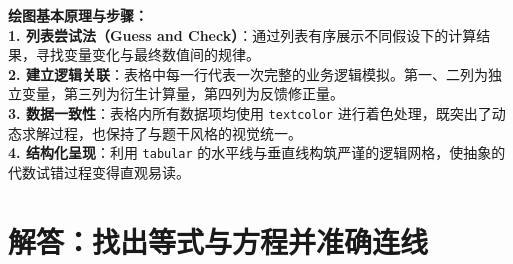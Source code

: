 \vspace{0.6cm}

{\small\color{blue!70!black}
\textbf{绘图基本原理与步骤：}\\
\textbf{1. 列表尝试法（Guess and Check）}：通过列表有序展示不同假设下的计算结果，寻找变量变化与最终数值间的规律。\\
\textbf{2. 建立逻辑关联}：表格中每一行代表一次完整的业务逻辑模拟。第一、二列为独立变量，第三列为衍生计算量，第四列为反馈修正量。\\
\textbf{3. 数据一致性}：表格内所有数据项均使用 \texttt{textcolor} 进行着色处理，既突出了动态求解过程，也保持了与题干风格的视觉统一。\\
\textbf{4. 结构化呈现}：利用 \texttt{tabular} 的水平线与垂直线构筑严谨的逻辑网格，使抽象的代数试错过程变得直观易读。
}



\newpage



\section{解答：找出等式与方程并准确连线}

\vspace{0.6cm}

